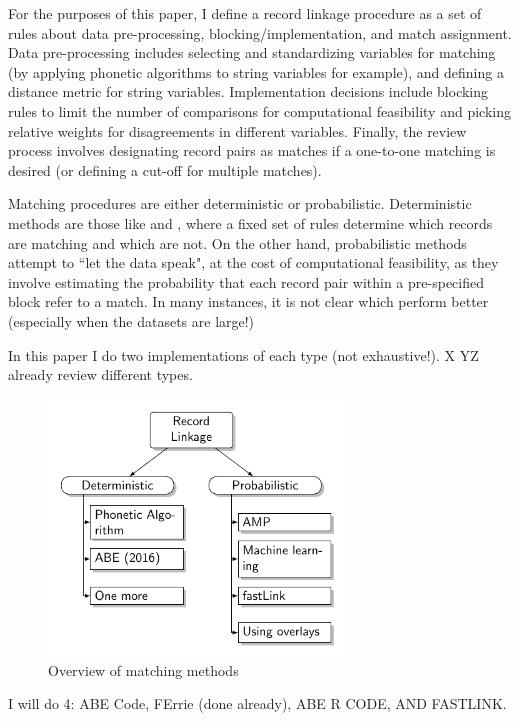 \documentclass[12pt]{article}
\begin{document}
For the purposes of this paper, I define a record linkage procedure as a set of rules about data pre-processing, blocking/implementation, and match assignment.  Data pre-processing includes selecting and standardizing variables for matching (by applying phonetic algorithms to string variables for example), and defining a distance metric for string variables.  Implementation decisions include blocking rules to limit the number of comparisons for computational feasibility and picking relative weights for disagreements in different variables.   Finally, the review process involves designating record pairs as matches if a one-to-one matching is desired (or defining a cut-off for multiple matches). 

Matching procedures are either deterministic or probabilistic.   Deterministic methods are those like \cite{abe} and \cite{ferrie}, where a fixed set of rules determine which records are matching and which are not.  On the other hand, probabilistic methods attempt to ``let the data speak", at the cost of computational feasibility, as they involve estimating the probability that each record pair within a pre-specified block refer to a match.  In many instances, it is not clear which perform better (especially when the datasets are large!)

In this paper I do two implementations of each type (not exhaustive!).   X YZ already review different types.   


\begin{figure}[h!]
\centering
\caption{Overview of matching methods}
\includegraphics[width=0.7\textwidth]{./RecordLinkageGraphics.pdf}
\end{figure}

I will do 4: ABE Code, FErrie (done already), ABE R CODE, AND FASTLINK. 
\end{document}
